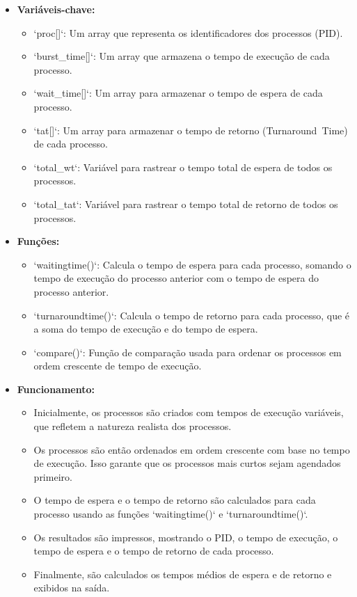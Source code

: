 \documentclass[
	12pt,				%
	openright,			%
	oneside,			%
	a4paper,			%
	chapter=TITLE,		%
	english,			%
	french,				%
	spanish,			%
	brazil				%
	]{abntex2}
\theoremstyle{definition}
\begin{document}
\begin{itemize}
    \item \textbf{Variáveis-chave:}
      \begin{itemize}
        \item `proc[]`: Um array que representa os identificadores dos processos (PID).
        \item `burst\_time[]`: Um array que armazena o tempo de execução de cada processo.
        \item `wait\_time[]`: Um array para armazenar o tempo de espera de cada processo.
        \item `tat[]`: Um array para armazenar o tempo de retorno (Turnaround\ Time) de cada processo.
        \item `total\_wt`: Variável para rastrear o tempo total de espera de todos os processos.
        \item `total\_tat`: Variável para rastrear o tempo total de retorno de todos os processos.
      \end{itemize}
  
    \item \textbf{Funções:}
      \begin{itemize}
        \item `waitingtime()`: Calcula o tempo de espera para cada processo, somando o tempo de execução do processo anterior com o tempo de espera do processo anterior.
        \item `turnaroundtime()`: Calcula o tempo de retorno para cada processo, que é a soma do tempo de execução e do tempo de espera.
        \item `compare()`: Função de comparação usada para ordenar os processos em ordem crescente de tempo de execução.
      \end{itemize}
  
    \item \textbf{Funcionamento:}
      \begin{itemize}
        \item Inicialmente, os processos são criados com tempos de execução variáveis, que refletem a natureza realista dos processos.
        \item Os processos são então ordenados em ordem crescente com base no tempo de execução. Isso garante que os processos mais curtos sejam agendados primeiro.
        \item O tempo de espera e o tempo de retorno são calculados para cada processo usando as funções `waitingtime()` e `turnaroundtime()`.
        \item Os resultados são impressos, mostrando o PID, o tempo de execução, o tempo de espera e o tempo de retorno de cada processo.
        \item Finalmente, são calculados os tempos médios de espera e de retorno e exibidos na saída.
      \end{itemize}
  \end{itemize}
\end{document}

